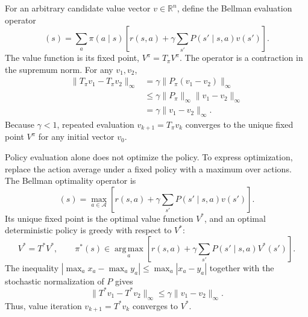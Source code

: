 For an arbitrary candidate value vector $v\in\mathbb{R}^{n}$, define the
Bellman evaluation operator
\begin{equation}
    [T_\pi v](s)
    =\sum_a\pi(a\mid s)
    \left[r(s,a)+\gamma\sum_{s'}P(s'\mid s,a)v(s')\right].
    \label{eq:rl-bellman-evaluation-operator}
\end{equation}
The value function is its fixed point, $V^\pi=T_\pi V^\pi$. The operator is a
contraction in the supremum norm. For any $v_1,v_2$,
\begin{align}
    \|T_\pi v_1-T_\pi v_2\|_\infty
    &=\gamma\|P_\pi(v_1-v_2)\|_\infty\\
    &\leq\gamma\|P_\pi\|_\infty\|v_1-v_2\|_\infty\\
    &=\gamma\|v_1-v_2\|_\infty.
    \label{eq:rl-policy-contraction}
\end{align}
Because $\gamma<1$, repeated evaluation $v_{k+1}=T_\pi v_k$ converges to the
unique fixed point $V^\pi$ for any initial vector $v_0$.

Policy evaluation alone does not optimize the policy. To express optimization,
replace the action average under a fixed policy with a maximum over actions.
The Bellman optimality operator is
\begin{equation}
    [T^*v](s)
    =\max_{a\in\mathcal{A}}
    \left[r(s,a)+\gamma\sum_{s'}P(s'\mid s,a)v(s')\right].
    \label{eq:rl-bellman-optimality}
\end{equation}
Its unique fixed point is the optimal value function $V^*$, and an optimal
deterministic policy is greedy with respect to $V^*$:
\begin{equation}
    V^*=T^*V^*,
    \qquad
    \pi^*(s)\in\operatorname*{arg\,max}_{a}
    \left[r(s,a)+\gamma\sum_{s'}P(s'\mid s,a)V^*(s')\right].
    \label{eq:rl-optimal-policy}
\end{equation}
The inequality
$|\max_a x_a-\max_a y_a|\leq\max_a|x_a-y_a|$ together with the stochastic
normalization of $P$ gives
\begin{equation}
    \|T^*v_1-T^*v_2\|_\infty
    \leq\gamma\|v_1-v_2\|_\infty.
    \label{eq:rl-optimality-contraction}
\end{equation}
Thus, value iteration $v_{k+1}=T^*v_k$ converges to $V^*$.


